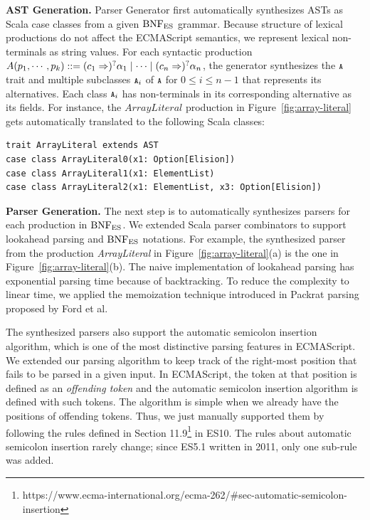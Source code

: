\textbf{AST Generation.}
{\sf Parser Generator} first automatically synthesizes ASTs as Scala case classes
from a given \( \text{BNF}_{\text{ES}} \) grammar.  Because structure of lexical productions do
not affect the ECMAScript semantics, we represent lexical non-terminals as
string values.  For each syntactic production \(
  A(p_1, \cdots, p_k) ::=
  (c_1 \Rightarrow)^? \alpha_1 \mid
  \cdots \mid
  (c_n \Rightarrow)^? \alpha_n
\), the generator synthesizes the \( \texttt{\footnotesize A} \) trait and multiple
subclasses \( \texttt{\footnotesize A}_i \) of \( \texttt{\footnotesize A} \) for \(0 \le i \le n-1\)
that represents its alternatives.  Each class \( \texttt{\footnotesize A}_i \) has
non-terminals in its corresponding alternative as its fields.
For instance, the \( ArrayLiteral \) production in Figure~\ref{fig:array-literal}
gets automatically translated to the following Scala classes:
\begin{lstlisting}[style=smallScalastyle]
trait ArrayLiteral extends AST
case class ArrayLiteral0(x1: Option[Elision])
case class ArrayLiteral1(x1: ElementList)
case class ArrayLiteral2(x1: ElementList, x3: Option[Elision])
\end{lstlisting}

\smallskip

\textbf{Parser Generation.}
The next step is to automatically synthesizes parsers for each production in \(
\text{BNF}_{\text{ES}} \).  We extended Scala parser combinators to support lookahead parsing
and \( \text{BNF}_{\text{ES}} \) notations. For example, the synthesized parser from the
production \textit{ArrayLiteral} in Figure~\ref{fig:array-literal}(a) is the one
in Figure~\ref{fig:array-literal}(b).  The naive implementation of lookahead
parsing has exponential parsing time because of backtracking.  To reduce the
complexity to linear time, we applied the memoization technique introduced in
Packrat parsing~\cite{packrat} proposed by Ford et al.  

The synthesized parsers also support the automatic semicolon insertion
algorithm, which is one of the most distinctive parsing features in ECMAScript.
We extended our parsing algorithm to keep track of the right-most position that
fails to be parsed in a given input.  In ECMAScript, the token at that position
is defined as an \textit{offending token} and the automatic semicolon insertion
algorithm is defined with such tokens.  The algorithm is simple when we already
have the positions of offending tokens.  Thus, we just manually supported them
by following the rules defined in Section
11.9\footnote{https://www.ecma-international.org/ecma-262/\#sec-automatic-semicolon-insertion}
in ES10.  The rules about automatic semicolon insertion rarely change; since
ES5.1 written in 2011, only one sub-rule was added.
